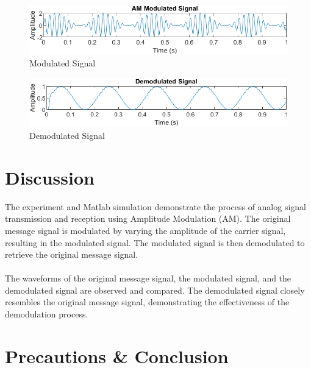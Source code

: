 \documentclass[12pt]{article}
\begin{document}
\begin{figure}[H]
    \centering
    \includegraphics[width=\textwidth]{mod.png}
    \caption{Modulated Signal}
    \label{fig:simulation_modulated_signal}
\end{figure}

\begin{figure}[H]
    \centering
    \includegraphics[width=\textwidth]{demod.png}
    \caption{Demodulated Signal}
    \label{fig:simulation_demodulated_signal}
\end{figure}

\section*{Discussion}
The experiment and Matlab simulation demonstrate the process of analog signal transmission and reception using Amplitude Modulation (AM). The original message signal is modulated by varying the amplitude of the carrier signal, resulting in the modulated signal. The modulated signal is then demodulated to retrieve the original message signal.
\\\\
The waveforms of the original message signal, the modulated signal, and the demodulated signal are observed and compared. The demodulated signal closely resembles the original message signal, demonstrating the effectiveness of the demodulation process.

\section*{Precautions \& Conclusion}
\end{document}
